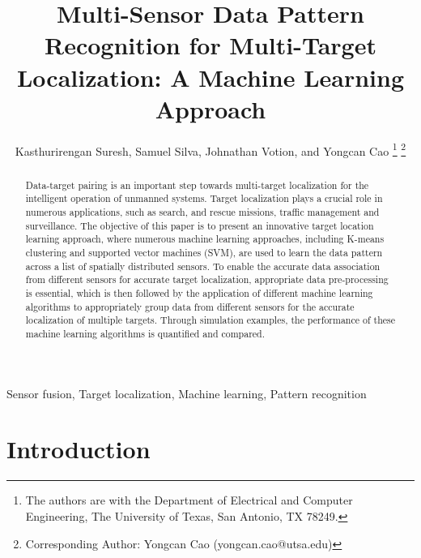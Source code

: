 \documentclass[letterpaper, 10 pt, conference]{ieeeconf}
\begin{document}
\title{Multi-Sensor Data Pattern Recognition for Multi-Target Localization: A Machine Learning Approach}
\author{Kasthurirengan Suresh, Samuel Silva, Johnathan Votion, and Yongcan Cao
\thanks{The authors are with the Department of Electrical and Computer Engineering, The University of Texas, San Antonio, TX 78249. 
}
\thanks{Corresponding Author: Yongcan Cao (yongcan.cao@utsa.edu)}
}

\markboth{}
         {}

\maketitle

\begin{abstract}
Data-target pairing is an important step towards multi-target localization for the intelligent operation of unmanned systems. Target localization plays a crucial role in numerous applications, such as search, and rescue missions, traffic management and surveillance. The objective of this paper is to present an innovative target location learning approach, where numerous machine learning approaches, including K-means clustering and supported vector machines (SVM), are used to learn the data pattern across a list of spatially distributed sensors. To enable the accurate data association from different sensors for accurate target localization, appropriate data pre-processing is essential, which is then followed by the application of different machine learning algorithms to appropriately group data from different sensors for the accurate localization of multiple targets. Through simulation examples, the performance of these machine learning algorithms is quantified and compared. 
\end{abstract}

\begin{keywords}
Sensor fusion, Target localization, Machine learning, Pattern recognition
\end{keywords}

\IEEEpeerreviewmaketitle


\section{Introduction}
\end{document}
